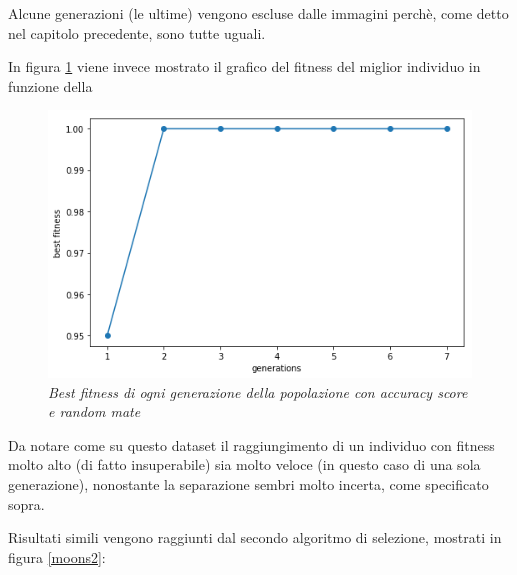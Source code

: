 \documentclass[12pt,a4paper]{report}
\begin{document}
Alcune generazioni (le ultime) vengono escluse dalle immagini perchè, come detto nel capitolo precedente, sono tutte uguali.

In figura \ref{best1} viene invece mostrato il grafico del fitness del miglior individuo in funzione della 

\begin{figure}[H]
 \centering
 \includegraphics[scale = 0.4]{images/moons-rnd-acc./best}
 \caption{\textit{Best fitness di ogni generazione della popolazione con accuracy score e random mate}}
 \label{best1}
\end{figure}

Da notare come su questo dataset il raggiungimento di un individuo con fitness molto alto (di fatto insuperabile) sia molto veloce (in questo caso di una sola generazione), nonostante la separazione sembri molto incerta, come specificato sopra.

Risultati simili vengono raggiunti dal secondo algoritmo di selezione, mostrati in figura \ref{moons2}:
\end{document}
